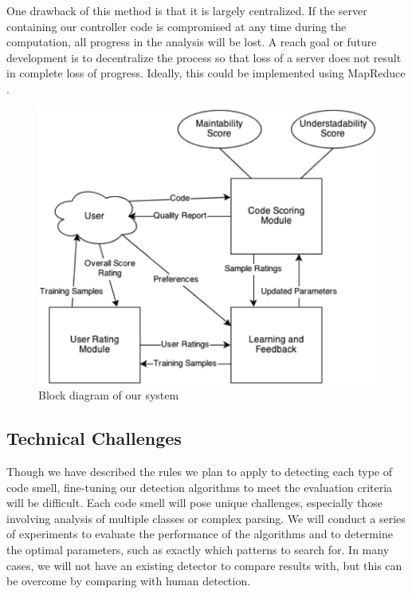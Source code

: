\documentclass{sig-alternate}
\begin{document}
One drawback of this method is that it is largely centralized. If the server containing our controller code is compromised at any time during the computation, all progress in the analysis will be lost. A reach goal or future development is to decentralize the process so that loss of a server does not result in complete loss of progress. Ideally, this could be implemented using MapReduce \cite{dean2008mapreduce}.


\begin{figure}[htb!]
	\begin{center}
		\includegraphics[width=0.9\linewidth]{block_diagram}
	\end{center}
	\vspace{-12pt}
	\caption{Block diagram of our system}
	\label{fig:some_graph}
\end{figure}

\subsection{Technical Challenges}
\label{subsec:tech_challenges}
Though we have described the rules we plan to apply to detecting each type of code smell, fine-tuning our detection algorithms to meet the evaluation criteria will be difficult. Each code smell will pose unique challenges, especially those involving analysis of multiple classes or complex parsing. We will conduct a series of experiments to evaluate the performance of the algorithms and to determine the optimal parameters, such as exactly which patterns to search for. In many cases, we will not have an existing detector to compare results with, but this can be overcome by comparing with human detection. 
\end{document}
